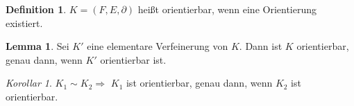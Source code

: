 \documentclass[a4paper, 12pt]{article}
\theoremstyle{plain}
\theoremstyle{definition}
\newtheorem{definition}[theorem]{Definition} %
\theoremstyle{lemma}
\newtheorem{lemma}[theorem]{Lemma}
\theoremstyle{remark}
\theoremstyle{corollary}
\newtheorem{corollary}[theorem]{Korollar}
\theoremstyle{example}
\begin{document}
	\begin{definition}
		$K=(F,E,\partial)$ heißt orientierbar, wenn eine Orientierung existiert.
	\end{definition}
	\begin{lemma}
		Sei $K'$ eine elementare Verfeinerung von $K$. Dann ist $K$ orientierbar, genau dann, wenn $K'$ orientierbar ist.
	\end{lemma}
	\begin{corollary}
		$K_1 \sim K_2 \Rightarrow$ $K_1$ ist orientierbar, genau dann, wenn $K_2$ ist orientierbar.
	\end{corollary}
\end{document}
